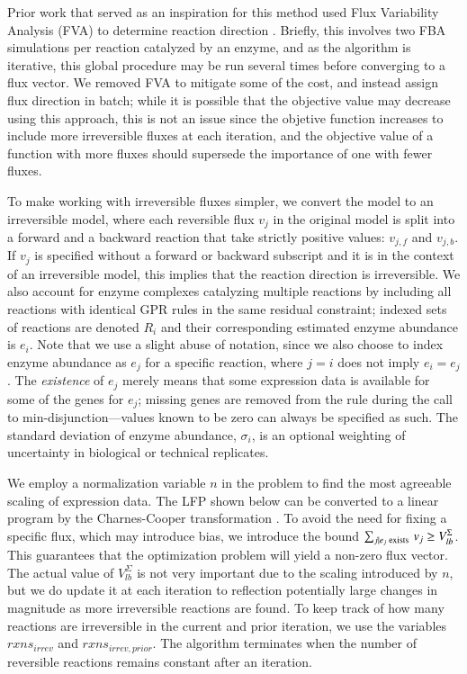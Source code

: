 Prior work that served as an inspiration for this method used Flux
Variability Analysis (FVA) to determine reaction direction
\citep{Lee2012}. Briefly, this involves two FBA simulations per
reaction catalyzed by an enzyme, and as the algorithm is iterative,
this global procedure may be run several times before converging to a
flux vector.  We removed FVA to mitigate some
of the cost, and instead assign flux direction in batch; while it is
possible that the objective value may decrease using this approach,
this is not an issue since the objetive function increases to include
more irreversible fluxes at each iteration, and the objective value of
a function with more fluxes should supersede the importance of one
with fewer fluxes.
 
To make working with irreversible fluxes simpler, we convert the model
to an irreversible model, where each reversible flux $v_j$ in the
original model is split into a forward and a backward reaction that take
strictly positive values: $v_{j,f}$ and $v_{j,b}$. If $v_j$ is
specified without a forward or backward subscript and it is in the
context of an irreversible model, this implies that the reaction
direction is irreversible. We also account for enzyme complexes
catalyzing multiple reactions by including all reactions with identical
GPR rules in the same residual
constraint; indexed sets of reactions are denoted $R_i$ and their
corresponding estimated enzyme abundance is $e_i$. Note that we use a
slight abuse of notation, since we also choose to index enzyme
abundance as $e_j$ for a specific reaction, where $j = i$ does not
imply $e_i = e_j$. The \emph{existence} of $e_j$ merely means that
some expression data is available for some of the genes for $e_j$;
missing genes are removed from the rule during the call to
min-disjunction---values known to be zero can always be specified as
such. The standard deviation of enzyme abundance, $\sigma_i$, is an
optional weighting of uncertainty in biological or technical
replicates.

We employ a normalization variable $n$ in the problem to find the most
agreeable scaling of expression data. The LFP shown below can be
converted to a linear program by the Charnes-Cooper transformation
\citep{Boyd2004}. To avoid the need for fixing a specific flux, which
may introduce bias, we introduce the bound $\sum_{j \mid e_j 
\textnormal{ exists }} v_j \geq V_{lb}^{\Sigma}$. This guarantees that
the optimization problem will yield a non-zero flux vector. The actual
value of $V_{lb}^{\Sigma}$ is not very important due to the scaling
introduced by $n$, but we do update it at each iteration to reflection
potentially large changes in magnitude as more irreversible reactions
are found. To keep track of how many reactions are irreversible in the
current and prior iteration, we use the variables $rxns_{irrev}$ and
$rxns_{irrev,prior}$. The algorithm terminates when the number of
reversible reactions remains constant after an iteration.

